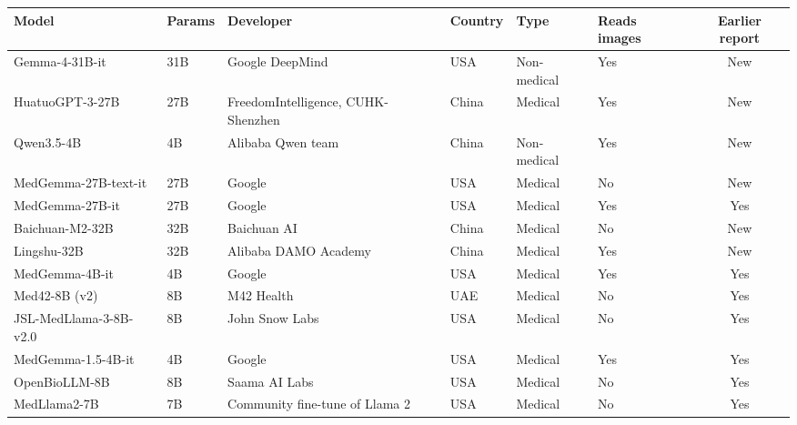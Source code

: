 \begin{tabular}{@{}llllllc@{}}
\toprule
Model & Params & Developer & Country & Type & Reads images & Earlier report \\
\midrule
Gemma-4-31B-it & 31B & Google DeepMind & USA & Non-medical & Yes & New \\
HuatuoGPT-3-27B & 27B & FreedomIntelligence, CUHK-Shenzhen & China & Medical & Yes & New \\
Qwen3.5-4B & 4B & Alibaba Qwen team & China & Non-medical & Yes & New \\
MedGemma-27B-text-it & 27B & Google & USA & Medical & No & New \\
MedGemma-27B-it & 27B & Google & USA & Medical & Yes & Yes \\
Baichuan-M2-32B & 32B & Baichuan AI & China & Medical & No & New \\
Lingshu-32B & 32B & Alibaba DAMO Academy & China & Medical & Yes & New \\
MedGemma-4B-it & 4B & Google & USA & Medical & Yes & Yes \\
Med42-8B (v2) & 8B & M42 Health & UAE & Medical & No & Yes \\
JSL-MedLlama-3-8B-v2.0 & 8B & John Snow Labs & USA & Medical & No & Yes \\
MedGemma-1.5-4B-it & 4B & Google & USA & Medical & Yes & Yes \\
OpenBioLLM-8B & 8B & Saama AI Labs & USA & Medical & No & Yes \\
MedLlama2-7B & 7B & Community fine-tune of Llama 2 & USA & Medical & No & Yes \\
\bottomrule
\end{tabular}
